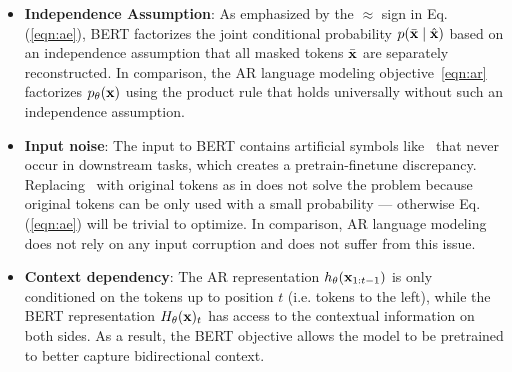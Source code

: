 \begin{itemize}[leftmargin=*,topsep=0em,itemsep=0em]
\item \textbf{Independence Assumption}: 
As emphasized by the $\approx$ sign in Eq. (\ref{eqn:ae}), BERT factorizes the joint conditional probability $p(\bar{{\mathbf{x}}} \mid \hat{{\mathbf{x}}})$ based on an independence assumption that all masked tokens $\bar{{\mathbf{x}}}$ are separately reconstructed.
In comparison, the AR language modeling objective~\eqref{eqn:ar} factorizes $p_\theta({\mathbf{x}})$ using the product rule that holds universally without such an independence assumption.
\item \textbf{Input noise}:
The input to BERT contains artificial symbols like \mask~that never occur in downstream tasks, which creates a pretrain-finetune discrepancy.
Replacing \mask~with original tokens as in \cite{devlin2018bert} does not solve the problem
because original tokens can be only used with a small probability --- otherwise Eq. (\ref{eqn:ae}) will be trivial to optimize.
In comparison, AR language modeling does not rely on any input corruption and does not suffer from this issue.
\item \textbf{Context dependency}: The AR representation $h_\theta({\mathbf{x}}_{1:t-1})$ is only conditioned on the tokens up to position $t$ (i.e. tokens to the left), while the BERT representation $H_\theta({\mathbf{x}})_t$ has access to the contextual information on both sides.
As a result, the BERT objective allows the model to be pretrained to better capture bidirectional context. %


\end{itemize}

